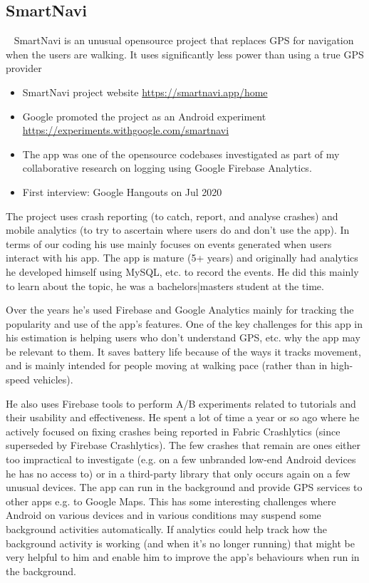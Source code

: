 



\subsection{SmartNavi}~\label{study-smartnavi}
SmartNavi is an unusual opensource project that replaces GPS for navigation when the users are walking. It uses significantly less power than using a true GPS provider 

\begin{itemize}
    \item SmartNavi project website \url{https://smartnavi.app/home}
    \item Google promoted the project as an Android experiment \url{https://experiments.withgoogle.com/smartnavi}
    \item The app was one of the opensource codebases investigated as part of my collaborative research on logging using Google Firebase Analytics.
    \item First interview: Google Hangouts on  Jul 2020
\end{itemize}


The project uses crash reporting (to catch, report, and analyse crashes) and mobile analytics (to try to ascertain where users do and don't use the app). In terms of our coding his use mainly focuses on events generated when users interact with his app.
The app is mature (5+ years) and originally had analytics he developed himself using MySQL, etc. to record the events. He did this mainly to learn about the topic, he was a bachelors|masters student at the time.

Over the years he's used Firebase and Google Analytics mainly for tracking the popularity and use of the app's features. One of the key challenges for this app in his estimation is helping users who don't understand GPS, etc. why the app may be relevant to them. It saves battery life because of the ways it tracks movement, and is mainly intended for people moving at walking pace (rather than in high-speed vehicles).

He also uses Firebase tools to perform A/B experiments related to tutorials and their usability and effectiveness.
He spent a lot of time a year or so ago where he actively focused on fixing crashes being reported in Fabric Crashlytics (since superseded by Firebase Crashlytics). The few crashes that remain are ones either too impractical to investigate (e.g. on a few unbranded low-end Android devices he has no access to) or in a third-party library that only occurs again on a few unusual devices.
The app can run in the background and provide GPS services to other apps e.g. to Google Maps. This has some interesting challenges where Android on various devices and in various conditions may suspend some background activities automatically. If analytics could help track how the background activity is working (and when it's no longer running) that might be very helpful to him and enable him to improve the app's behaviours when run in the background.

